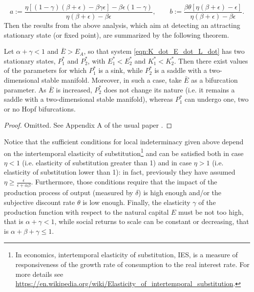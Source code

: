 \begin{equation} \label{eqn:a_b_def}
	a:=\frac{\eta[(1-\gamma)(\beta+\epsilon)-\beta\gamma\epsilon]-\beta\epsilon(1-\gamma)}{\eta(\beta+\epsilon)-\beta\epsilon}, \qquad b:=\frac{\beta\theta[\eta(\beta+\epsilon)-\epsilon]}{\eta(\beta+\epsilon)-\beta\epsilon}.
\end{equation}
Then the results from the above analysis, which aim at detecting an attracting stationary state (or fixed point), are summarized by the following theorem.
\begin{thm} \label{thm:result_of_analysis}
	Let $\alpha+\gamma<1$ and $\bar{E}>E_A$, so that system \eqref{eqn:K_dot_E_dot_L_dot} has two stationary states, $P_1^*$ and $P_2^*$, with $E_1^*<E_2^*$ and $K_1^*<K_2^*$. Then there exist values of the parameters for which $P_1^*$ is a sink, while $P_2^*$ is a saddle with a two-dimensional stable manifold. Moreover, in such a case, take $\bar{E}$ as a bifurcation parameter. As $\bar{E}$ is increased, $P_2^*$ does not change its nature (i.e. it remains a saddle with a two-dimensional stable manifold), whereas $P_1^*$ can undergo one, two or no Hopf bifurcations.
\end{thm}
\begin{proof}
	Omitted. See Appendix A of the usual paper \cite{antoci_poverty_2011}.
\end{proof}
Notice that the sufficient conditions for local indeterminacy given above depend on the intertemporal elasticity of substitution\footnote{In economics, intertemporal elasticity of substitution, IES, is a measure of responsiveness of the growth rate of consumption to the real interest rate. For more details see \url{https://en.wikipedia.org/wiki/Elasticity_of_intertemporal_substitution}.} 
and can be satisfied both in case $\eta<1$ (i.e. elasticity of substitution greater than 1) and in case $\eta>1$ (i.e. elasticity of substitution lower than 1): in fact, previously they have assumed $\eta\geq \frac{\epsilon}{\epsilon+\alpha\beta}$. Furthermore, those conditions require that the impact of the production process of output (measured by $\delta$) is high enough and/or the subjective discount rate $\theta$ is low enough. Finally, the elasticity $\gamma$ of the production function with respect to the natural capital $E$ must be not too high, that is $\alpha+\gamma<1$, while social returns to scale can be constant or decreasing, that is $\alpha+\beta+\gamma\leq1$.

